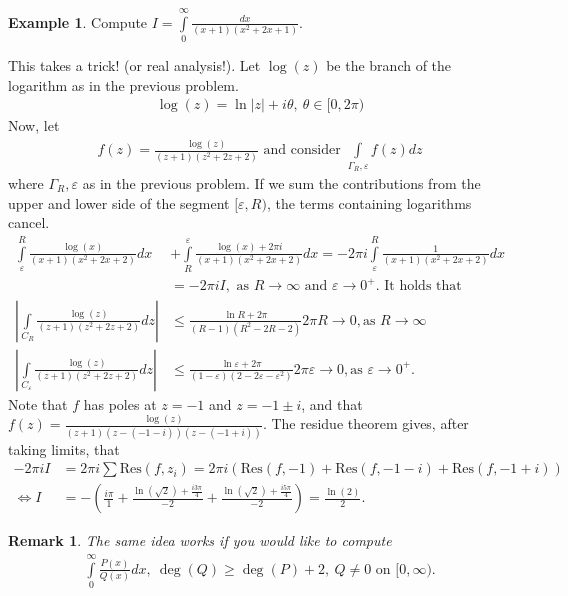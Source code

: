 \documentclass[12pt, a4paper]{article}
\theoremstyle{plain}
\newtheorem{rem}{Remark}
\theoremstyle{definition}
\newtheorem{example}{Example} %
\begin{document}
			\begin{example}
				Compute $\displaystyle I =\int\limits_{0}^{\infty}\frac{dx}{(x+1)(x^2+2x+1)}$.

				This takes a trick! (or real analysis!). Let $\log(z)$ be the branch of the logarithm as in the previous problem.
				\begin{align*}
					\log(z) = \ln|z| + i\theta,\:\theta\in[0,2\pi)
				\end{align*}
				Now, let
				\begin{align*}
					f(z) = \frac{\log(z)}{(z+1)(z^2+2z+2)} \text{ and consider }\int\limits_{\Gamma_R,\varepsilon}f(z)dz
				\end{align*}
				where $\Gamma_R,\varepsilon$ as in the previous problem. If we sum the contributions from the upper and lower side of the segment $[\varepsilon,R)$, the terms containing logarithms cancel.
				\begin{align*}
					\int\limits_\varepsilon^{R}\frac{\log(x)}{(x+1)(x^2+2x+2)}dx &+ 
					\int\limits_R^{\varepsilon}\frac{\log(x)+2\pi i}{(x+1)(x^2+2x+2)}dx  =
					-2\pi i\int\limits_\varepsilon^{R}\frac{1}{(x+1)(x^2+2x+2)}dx\\ &=
					-2\pi i I,\text{ as $R\to\infty$ and $\varepsilon\to 0^+$. It holds that}\\
					\left|\int\limits_{C_R}\frac{\log(z)}{(z+1)(z^2+2z+2)}dz\right| &\le \frac{\ln R + 2\pi}{(R-1)(R^2-2R-2)}2\pi R \to 0,\text{as $R\to\infty$}\\
					\left|\int\limits_{C_\varepsilon}\frac{\log(z)}{(z+1)(z^2+2z+2)}dz\right| &\le \frac{\ln \varepsilon + 2\pi}{(1- \varepsilon)(2-2 \varepsilon- \varepsilon^2)}2\pi \varepsilon \to 0,\text{as $\varepsilon\to0^+$}.
				\end{align*}
				Note that $f$ has poles at $z=-1$ and $z=-1\pm i$, and that $\displaystyle f(z) = \frac{\log(z)}{(z+1)(z-(-1-i))(z-(-1+i))}$. The residue theorem gives, after taking limits, that
				\begin{align*}
					-2\pi i I &= 
					2\pi i \sum \mathrm{Res}(f,z_i) = 
					2\pi i(\mathrm{Res}(f,-1)+\mathrm{Res}(f,-1-i)+\mathrm{Res}(f,-1+i))\\ \iff I &=
					-\left(\frac{i\pi}{1}+\frac{\ln(\sqrt{2})+\frac{i3\pi}{4}}{-2}+\frac{\ln(\sqrt{2})+\frac{i5\pi}{4}}{-2}\right) = \frac{\ln(2)}{2}.
				\end{align*}
			\end{example}

			\begin{rem}
				The same idea works if you would like to compute
				\begin{align*}
					\int\limits_{0}^{\infty}\frac{P(x)}{Q(x)}dx,\:\deg{(Q)}\ge \deg{(P)}+2,\:Q\not=0\text{ on }[0,\infty).
				\end{align*}
			\end{rem}
\end{document}
